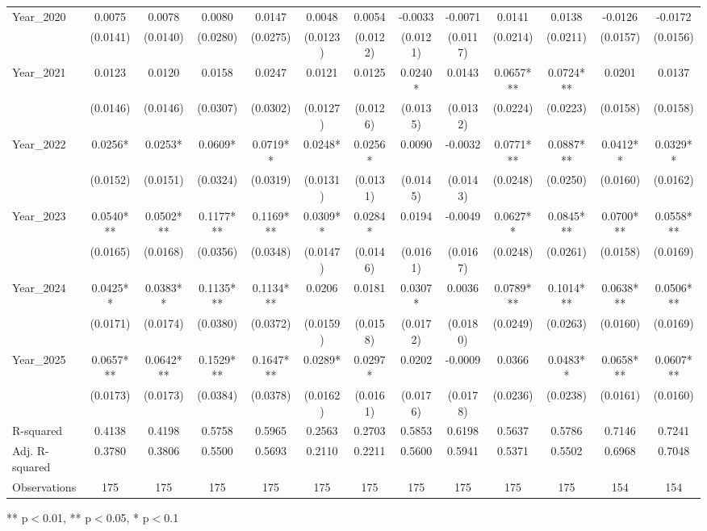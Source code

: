\begin{table}[htbp]
\begin{tabular}{lcccccccccccc}
Year\_2020 & 0.0075 & 0.0078 & 0.0080 & 0.0147 & 0.0048 & 0.0054 & -0.0033 & -0.0071 & 0.0141 & 0.0138 & -0.0126 & -0.0172 \\
 & (0.0141) & (0.0140) & (0.0280) & (0.0275) & (0.0123) & (0.0122) & (0.0121) & (0.0117) & (0.0214) & (0.0211) & (0.0157) & (0.0156) \\
Year\_2021 & 0.0123 & 0.0120 & 0.0158 & 0.0247 & 0.0121 & 0.0125 & 0.0240* & 0.0143 & 0.0657*** & 0.0724*** & 0.0201 & 0.0137 \\
 & (0.0146) & (0.0146) & (0.0307) & (0.0302) & (0.0127) & (0.0126) & (0.0135) & (0.0132) & (0.0224) & (0.0223) & (0.0158) & (0.0158) \\
Year\_2022 & 0.0256* & 0.0253* & 0.0609* & 0.0719** & 0.0248* & 0.0256* & 0.0090 & -0.0032 & 0.0771*** & 0.0887*** & 0.0412** & 0.0329** \\
 & (0.0152) & (0.0151) & (0.0324) & (0.0319) & (0.0131) & (0.0131) & (0.0145) & (0.0143) & (0.0248) & (0.0250) & (0.0160) & (0.0162) \\
Year\_2023 & 0.0540*** & 0.0502*** & 0.1177*** & 0.1169*** & 0.0309** & 0.0284* & 0.0194 & -0.0049 & 0.0627** & 0.0845*** & 0.0700*** & 0.0558*** \\
 & (0.0165) & (0.0168) & (0.0356) & (0.0348) & (0.0147) & (0.0146) & (0.0161) & (0.0167) & (0.0248) & (0.0261) & (0.0158) & (0.0169) \\
Year\_2024 & 0.0425** & 0.0383** & 0.1135*** & 0.1134*** & 0.0206 & 0.0181 & 0.0307* & 0.0036 & 0.0789*** & 0.1014*** & 0.0638*** & 0.0506*** \\
 & (0.0171) & (0.0174) & (0.0380) & (0.0372) & (0.0159) & (0.0158) & (0.0172) & (0.0180) & (0.0249) & (0.0263) & (0.0160) & (0.0169) \\
Year\_2025 & 0.0657*** & 0.0642*** & 0.1529*** & 0.1647*** & 0.0289* & 0.0297* & 0.0202 & -0.0009 & 0.0366 & 0.0483** & 0.0658*** & 0.0607*** \\
 & (0.0173) & (0.0173) & (0.0384) & (0.0378) & (0.0162) & (0.0161) & (0.0176) & (0.0178) & (0.0236) & (0.0238) & (0.0161) & (0.0160) \\
\hline
R-squared & 0.4138 & 0.4198 & 0.5758 & 0.5965 & 0.2563 & 0.2703 & 0.5853 & 0.6198 & 0.5637 & 0.5786 & 0.7146 & 0.7241 \\
Adj. R-squared & 0.3780 & 0.3806 & 0.5500 & 0.5693 & 0.2110 & 0.2211 & 0.5600 & 0.5941 & 0.5371 & 0.5502 & 0.6968 & 0.7048 \\
Observations & 175 & 175 & 175 & 175 & 175 & 175 & 175 & 175 & 175 & 175 & 154 & 154 \\
\hline\hline
\end{tabular}
\begin{tablenotes}[flushleft]
\footnotesize
\item *** p$<$0.01, ** p$<$0.05, * p$<$0.1
\end{tablenotes}
\end{table}
